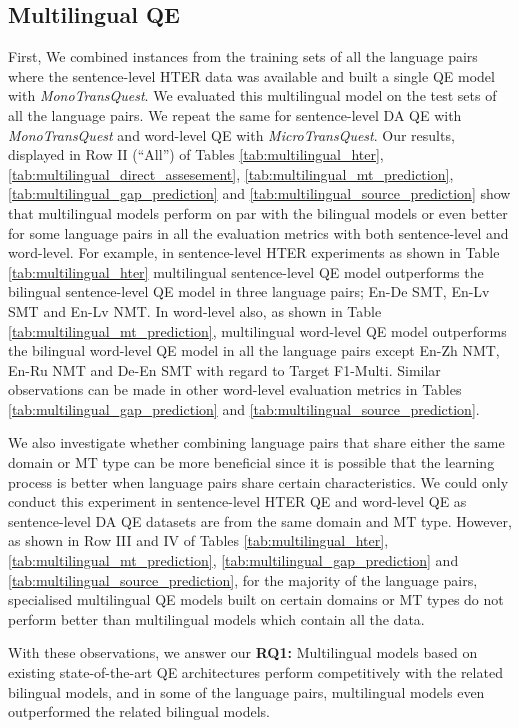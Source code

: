 \subsection{Multilingual QE}
First, We combined instances from the training sets of all the language pairs where the sentence-level HTER data was available and built a single QE model with \textit{MonoTransQuest}. We evaluated this multilingual model on the test sets of all the language pairs. We repeat the same for sentence-level DA QE with \textit{MonoTransQuest} and word-level QE with \textit{MicroTransQuest}. 
Our results, displayed in Row II (``All'') of Tables \ref{tab:multilingual_hter}, \ref{tab:multilingual_direct_assesement}, \ref{tab:multilingual_mt_prediction}, \ref{tab:multilingual_gap_prediction} and \ref{tab:multilingual_source_prediction} show that multilingual models perform on par with the bilingual models or even better for some language pairs in all the evaluation metrics with both sentence-level and word-level. For example, in sentence-level HTER experiments as shown in Table \ref{tab:multilingual_hter}  multilingual sentence-level QE model outperforms the bilingual sentence-level QE model in three language pairs; En-De SMT, En-Lv SMT and En-Lv NMT. In word-level also, as shown in Table \ref{tab:multilingual_mt_prediction}, multilingual word-level QE model outperforms the bilingual word-level QE model in all the language pairs except En-Zh NMT, En-Ru NMT and De-En SMT with regard to Target F1-Multi. Similar observations can be made in other word-level evaluation metrics in Tables  \ref{tab:multilingual_gap_prediction} and \ref{tab:multilingual_source_prediction}. 

We also investigate whether combining language pairs that share either the same domain or MT type can be more beneficial since it is possible that the learning process is better when language pairs share certain characteristics. We could only conduct this experiment in sentence-level HTER QE and word-level QE as sentence-level DA QE datasets are from the same domain and MT type. However, as shown in Row III and IV of Tables \ref{tab:multilingual_hter}, \ref{tab:multilingual_mt_prediction}, \ref{tab:multilingual_gap_prediction} and \ref{tab:multilingual_source_prediction}, for the majority of the language pairs, specialised multilingual  QE models built on certain domains or MT types do not perform better than multilingual models which contain all the data.

With these observations, we answer our \textbf{RQ1:} Multilingual models based on existing state-of-the-art QE architectures perform competitively with the related bilingual models, and in some of the language pairs, multilingual models even outperformed the related bilingual models. 

